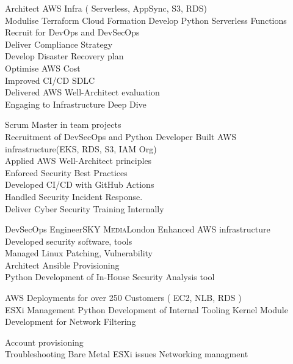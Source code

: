 \documentclass[10pt,a4paper,sans]{moderncv} %
\begin{document}
{
	Architect AWS Infra ( Serverless, AppSync, S3, RDS) \\
	Modulise Terraform Cloud Formation
	Develop Python Serverless Functions \\
	Recruit for DevOps and DevSecOps \\
	Deliver Compliance Strategy\\
	Develop Disaster Recovery plan\\
	Optimise AWS Cost \\
	Improved CI/CD SDLC \\
	Delivered AWS Well-Architect evaluation\\
	Engaging to Infrastructure Deep Dive\\
}

{
	Scrum Master in team projects\\
	Recruitment of DevSecOps and Python Developer
	Built AWS infrastructure(EKS, RDS, S3, IAM Org) \\
	Applied AWS Well-Architect principles \\
	Enforced Security Best Practices\\
	Developed CI/CD with GitHub Actions\\
	Handled Security Incident Response.\\
	Deliver Cyber Security Training Internally\\
}

 {DevSecOps Engineer}{\textsc{SKY Media}}{London}{}
{
	Enhanced AWS infrastructure \\
	Developed security software, tools \\
	Managed Linux Patching, Vulnerability \\
	Architect Ansible Provisioning \\
	Python Development of In-House Security Analysis tool\\
}

{
	AWS Deployments for over 250 Customers ( EC2, NLB, RDS )\\
	ESXi Management
	Python Development of Internal Tooling
	Kernel Module Development for Network Filtering\\
}

{
	Account provisioning\\
	Troubleshooting Bare Metal ESXi issues
	Networking managment\\
}
\end{document}
